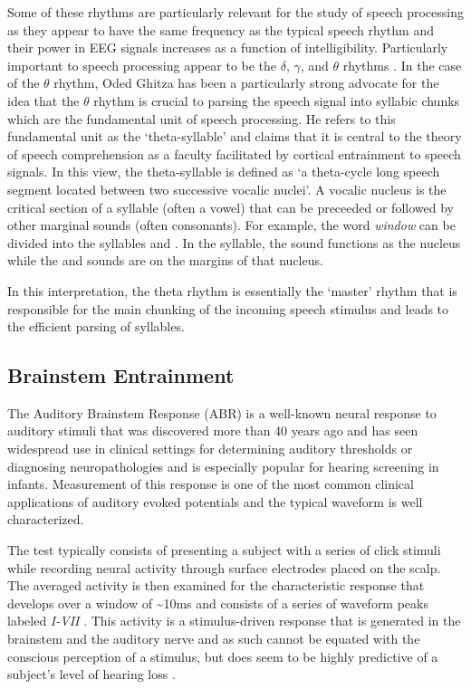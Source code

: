 \documentclass[titlepage]{article}
\begin{document}
    Some of these rhythms are particularly relevant for the study of speech processing as they appear
    to have the same frequency as the typical speech rhythm and their power in EEG signals increases
    as a function of intelligibility. Particularly important to speech processing appear to be
    the $\delta$, $\gamma$, and $\theta$ rhythms \cite{Ghitza2009,Meyer2018}. In the case of the
    $\theta$ rhythm, Oded Ghitza has been a particularly strong advocate for the idea that the
    $\theta$ rhythm is crucial to parsing the speech signal into syllabic chunks which are the
    fundamental unit of speech processing. He refers to this fundamental unit as the `theta-syllable'
    \cite{Ghitza2013} and claims that it is central to the theory of speech comprehension as a
    faculty facilitated by cortical entrainment to speech signals. In this view, the theta-syllable
    is defined as `a theta-cycle long speech segment located between two successive vocalic nuclei'.
    A vocalic nucleus is the critical section of a syllable (often a vowel) that can be preceeded
    or followed by other marginal sounds (often consonants). For example, the word \textit{window}
    can be divided into the syllables  and . In the 
    syllable, the  sound functions as the nucleus while the  and 
    sounds are on the margins of that nucleus.

    In this interpretation, the theta rhythm is essentially the `master' rhythm that is responsible
    for the main chunking of the incoming speech stimulus and leads to the efficient parsing of
    syllables.

  \subsection{Brainstem Entrainment} \label{brainstemEntrainment}

    The Auditory Brainstem Response (ABR) is a well-known neural response
    to auditory stimuli that was discovered more than 40 years ago \cite{Jewett1971,Jewett1970}
    and has seen widespread use in clinical settings for determining auditory thresholds
    or diagnosing neuropathologies \cite{Skoe2010} and is especially popular for hearing screening in infants.
    Measurement of this response is one of the
    most common clinical applications of auditory evoked potentials and the typical waveform is well
    characterized.

    The test typically consists of presenting a subject with a series of click stimuli while recording
    neural activity through surface electrodes placed on the scalp. The averaged activity is then examined
    for the characteristic response that develops over a window of \textasciitilde 10ms and consists of
    a series of waveform peaks labeled \textit{I-VII} \cite{Sininger1993,Bhattacharyya2017}. This activity
    is a stimulus-driven response that is generated in the brainstem and the auditory nerve and as such
    cannot be equated with the conscious perception of a stimulus, but does seem to be highly predictive of
    a subject's level of hearing loss \cite{Sininger1993}.
\end{document}
